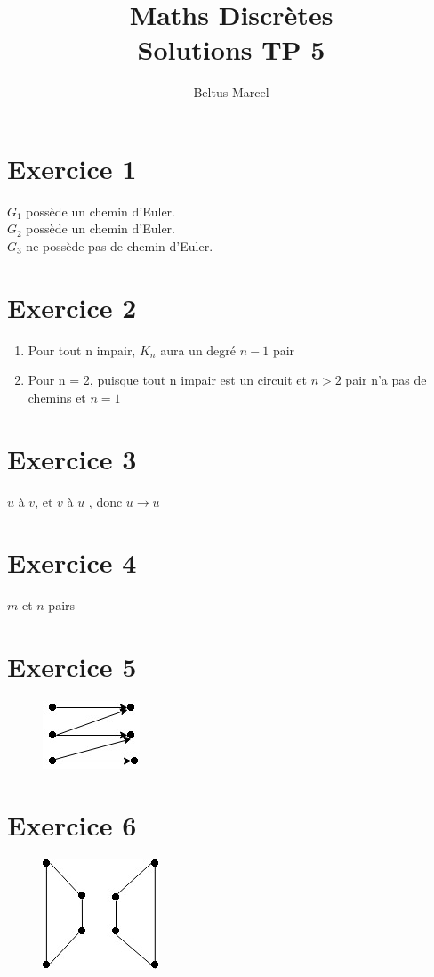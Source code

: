 \documentclass[fontsize=10pt]{article}
\title{\textbf{Maths Discrètes}\\ Solutions TP 5}
\author{Beltus Marcel}
\date{}
\begin{document}
\maketitle %


\section*{Exercice 1}
$G_1$ possède un chemin d'Euler.\\
$G_2$ possède un chemin d'Euler.\\
$G_3$ ne possède pas de chemin d'Euler.

\section*{Exercice 2}
\begin{enumerate}
\item Pour tout n impair, $K_n$ aura un degré $n-1$ pair
\item Pour n = 2, puisque tout n impair est un circuit et $n>2$ pair n'a pas de chemins et $n=1$
\end{enumerate}

\section*{Exercice 3}

$u$ à $v$, et $v$ à $u$ , donc $u\rightarrow u$

\section*{Exercice 4}
$m$ et $n$ pairs
\section*{Exercice 5}
\begin{figure}[hbtp]
\centering
\includegraphics[scale=1]{TP5Exo5.jpg}
\end{figure}

\section*{Exercice 6}

\begin{figure}[hbtp]
\centering
\includegraphics[scale=1]{TP5Exo6.jpg}
\end{figure}
\end{document}
